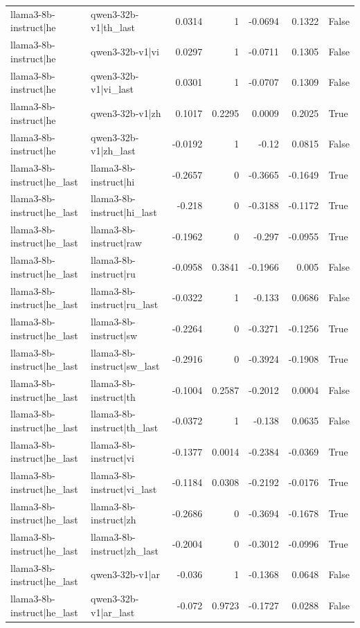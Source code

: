 \begin{table}
\begin{tabular}{l l r r r r l}
llama3-8b-instruct|he & qwen3-32b-v1|th_last & 0.0314 & 1 & -0.0694 & 0.1322 & False \\
llama3-8b-instruct|he & qwen3-32b-v1|vi & 0.0297 & 1 & -0.0711 & 0.1305 & False \\
llama3-8b-instruct|he & qwen3-32b-v1|vi_last & 0.0301 & 1 & -0.0707 & 0.1309 & False \\
llama3-8b-instruct|he & qwen3-32b-v1|zh & 0.1017 & 0.2295 & 0.0009 & 0.2025 & True \\
llama3-8b-instruct|he & qwen3-32b-v1|zh_last & -0.0192 & 1 & -0.12 & 0.0815 & False \\
llama3-8b-instruct|he_last & llama3-8b-instruct|hi & -0.2657 & 0 & -0.3665 & -0.1649 & True \\
llama3-8b-instruct|he_last & llama3-8b-instruct|hi_last & -0.218 & 0 & -0.3188 & -0.1172 & True \\
llama3-8b-instruct|he_last & llama3-8b-instruct|raw & -0.1962 & 0 & -0.297 & -0.0955 & True \\
llama3-8b-instruct|he_last & llama3-8b-instruct|ru & -0.0958 & 0.3841 & -0.1966 & 0.005 & False \\
llama3-8b-instruct|he_last & llama3-8b-instruct|ru_last & -0.0322 & 1 & -0.133 & 0.0686 & False \\
llama3-8b-instruct|he_last & llama3-8b-instruct|sw & -0.2264 & 0 & -0.3271 & -0.1256 & True \\
llama3-8b-instruct|he_last & llama3-8b-instruct|sw_last & -0.2916 & 0 & -0.3924 & -0.1908 & True \\
llama3-8b-instruct|he_last & llama3-8b-instruct|th & -0.1004 & 0.2587 & -0.2012 & 0.0004 & False \\
llama3-8b-instruct|he_last & llama3-8b-instruct|th_last & -0.0372 & 1 & -0.138 & 0.0635 & False \\
llama3-8b-instruct|he_last & llama3-8b-instruct|vi & -0.1377 & 0.0014 & -0.2384 & -0.0369 & True \\
llama3-8b-instruct|he_last & llama3-8b-instruct|vi_last & -0.1184 & 0.0308 & -0.2192 & -0.0176 & True \\
llama3-8b-instruct|he_last & llama3-8b-instruct|zh & -0.2686 & 0 & -0.3694 & -0.1678 & True \\
llama3-8b-instruct|he_last & llama3-8b-instruct|zh_last & -0.2004 & 0 & -0.3012 & -0.0996 & True \\
llama3-8b-instruct|he_last & qwen3-32b-v1|ar & -0.036 & 1 & -0.1368 & 0.0648 & False \\
llama3-8b-instruct|he_last & qwen3-32b-v1|ar_last & -0.072 & 0.9723 & -0.1727 & 0.0288 & False \\

\end{tabular}
\end{table}
